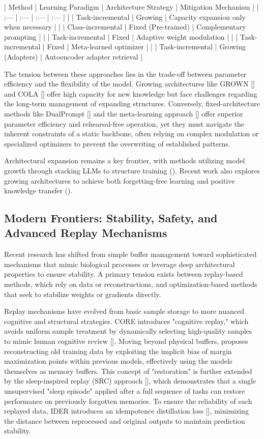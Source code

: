 \documentclass[11pt]{article}
\begin{document}
| Method | Learning Paradigm | Architecture Strategy | Mitigation Mechanism |
| :--- | :--- | :--- | :--- |
| \citep{2110.00908} | Task-incremental | Growing | Capacity expansion only when necessary |
| \citep{2204.04799} | Class-incremental | Fixed (Pre-trained) | Complementary prompting |
| \citep{2311.15276} | Task-incremental | Fixed | Adaptive weight modulation |
| \citep{2408.03219} | Task-incremental | Fixed | Meta-learned optimizer |
| \citep{2510.21836} | Task-incremental | Growing (Adapters) | Autoencoder adapter retrieval |

The tension between these approaches lies in the trade-off between parameter efficiency and the flexibility of the model. Growing architectures like GROWN [\citep{2110.00908}] and COLA [\citep{2510.21836}] offer high capacity for new knowledge but face challenges regarding the long-term management of expanding structures. Conversely, fixed-architecture methods like DualPrompt [\citep{2204.04799}] and the meta-learning approach [\citep{2408.03219}] offer superior parameter efficiency and rehearsal-free operation, yet they must navigate the inherent constraints of a static backbone, often relying on complex modulation or specialized optimizers to prevent the overwriting of established patterns.

Architectural expansion remains a key frontier, with methods utilizing model growth through stacking LLMs to structure training (\citep{2509.01213}). Recent work also explores growing architectures to achieve both forgetting-free learning and positive knowledge transfer (\citep{2601.05623}).
\subsection{Modern Frontiers: Stability, Safety, and Advanced Replay Mechanisms}

Recent research has shifted from simple buffer management toward sophisticated mechanisms that mimic biological processes or leverage deep architectural properties to ensure stability. A primary tension exists between replay-based methods, which rely on data or reconstructions, and optimization-based methods that seek to stabilize weights or gradients directly.

Replay mechanisms have evolved from basic sample storage to more nuanced cognitive and structural strategies. CORE introduces "cognitive replay," which avoids uniform sample treatment by dynamically selecting high-quality samples to mimic human cognitive review [\citep{2402.01348}]. Moving beyond physical buffers, \citep{2411.06916} proposes reconstructing old training data by exploiting the implicit bias of margin maximization points within previous models, effectively using the models themselves as memory buffers. This concept of "restoration" is further extended by the sleep-inspired replay (SRC) approach [\citep{2606.08447}], which demonstrates that a single unsupervised "sleep episode" applied after a full sequence of tasks can restore performance on previously forgotten memories. To ensure the reliability of such replayed data, IDER introduces an idempotence distillation loss [\citep{2603.00624}], minimizing the distance between reprocessed and original outputs to maintain prediction stability.
\end{document}
